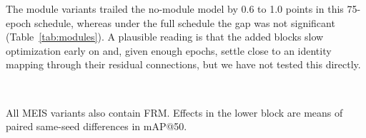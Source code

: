 \documentclass[preprint,12pt]{elsarticle}
\begin{document}
The module variants trailed the no-module model by 0.6 to 1.0 points in this
75-epoch schedule, whereas under the full schedule the gap was not significant
(Table~\ref{tab:modules}). A plausible reading is that the added blocks slow
optimization early on and, given enough epochs, settle close to an identity mapping
through their residual connections, but we have not tested this directly.

\begin{table}[t]
\centering
\caption{Factorial ablation of MEIS on Baseline-P2 with the 75-epoch progressive
schedule (mean $\pm$ s.d.\ over seeds 0 and 42).}
\label{tab:factorial}
\small
{}
\\[2pt]
\begin{minipage}{\linewidth}\footnotesize
All MEIS variants also contain FRM. Effects in the lower block are means of paired
same-seed differences in mAP@50.
\end{minipage}
\end{table}
\end{document}
